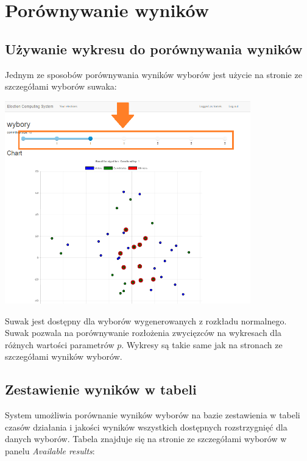 \documentclass[pdflatex,11pt]{../aghdoc_version2}
\begin{document}
\section{Porównywanie wyników}
\label{sec:porownywaniewynikow}

\subsection{Używanie wykresu do porównywania wyników}
\label{subsec:pornawykresie}
Jednym ze sposobów porównywania wyników wyborów jest użycie na stronie ze szczegółami wyborów suwaka: \\

\begin{center}
\includegraphics[width=0.8\textwidth]{pics/results_suwak.png}
\end{center}

\vspace{\baselineskip}
Suwak jest dostępny dla wyborów wygenerowanych z rozkładu normalnego. Suwak pozwala na porównywanie rozłożenia zwycięzców na wykresach dla różnych wartości parametrów $p$. Wykresy są takie same jak na stronach ze szczegółami wyników wyborów. 

\newpage
\subsection{Zestawienie wyników w tabeli}
\label{subsec:tabelazwynikami}

System umożliwia porównanie wyników wyborów na bazie zestawienia w tabeli czasów działania i jakości wyników wszystkich dostępnych rozstrzygnięć dla danych wyborów. Tabela znajduje się na stronie ze szczegółami wyborów w panelu \textit{Available results}: \\
\end{document}
